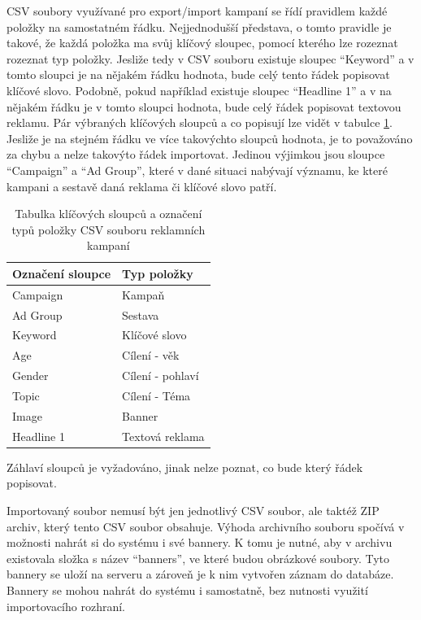 CSV soubory využívané pro export/import kampaní se řídí pravidlem každé položky na samostatném řádku. Nejjednodušší představa, o tomto pravidle je takové, že
každá položka ma svůj klíčový sloupec, pomocí kterého lze rozeznat rozeznat typ položky. Jesliže tedy v CSV souboru existuje sloupec \enquote{Keyword} a v tomto sloupci je
na nějakém řádku hodnota, bude celý tento řádek popisovat klíčové slovo. Podobně, pokud například existuje sloupec \enquote{Headline 1} a v na nějakém řádku 
je v tomto sloupci hodnota, bude celý řádek popisovat textovou reklamu. Pár výbraných klíčových sloupců a co popisují lze vidět v tabulce \ref{tab:csv-columns}.
Jesliže je na stejném řádku ve více takovýchto sloupců hodnota, je to považováno za chybu a nelze takovýto řádek importovat. Jedinou výjimkou jsou sloupce
\enquote{Campaign} a \enquote{Ad Group}, které v dané situaci nabývají významu, ke které kampani a sestavě daná reklama či klíčové slovo patří.

\begin{table}[h]
    \centering
    \begin{tabular}{ |l|l| }
        \hline
        Označení sloupce & Typ položky \\
        \hline
        Campaign & Kampaň \\
        Ad Group & Sestava \\
        Keyword & Klíčové slovo \\
        Age & Cílení - věk \\
        Gender & Cílení - pohlaví \\
        Topic & Cílení - Téma \\
        Image & Banner \\
        Headline 1 & Textová reklama \\
        \hline
    \end{tabular}
    \caption{Tabulka klíčových sloupců a označení typů položky CSV souboru reklamních kampaní}
    \label{tab:csv-columns}
\end{table}

Záhlaví sloupců je vyžadováno, jinak nelze poznat, co bude který řádek popisovat.

Importovaný soubor nemusí být jen jednotlivý CSV soubor, ale taktéž ZIP archiv, který tento CSV soubor obsahuje.
Výhoda archivního souboru spočívá v možnosti nahrát si do systému i své bannery. K tomu je nutné, aby
v archivu existovala složka s název \enquote{banners}, ve které budou obrázkové soubory. Tyto bannery se uloží na serveru a zároveň
je k nim vytvořen záznam do databáze. Bannery se mohou nahrát do systému i samostatně, bez nutnosti využití importovacího rozhraní.


